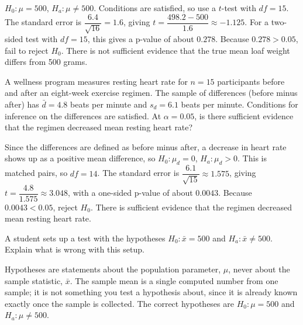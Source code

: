 \begin{Answer}[ref={ex:means-test-bakery}]
$H_0: \mu = 500$, $H_a: \mu \neq 500$. Conditions are satisfied, so use a $t$-test with $df = 15$. The standard error is $\dfrac{6.4}{\sqrt{16}} = 1.6$, giving $t = \dfrac{498.2 - 500}{1.6} \approx -1.125$. For a two-sided test with $df = 15$, this gives a p-value of about $0.278$. Because $0.278 > 0.05$, fail to reject $H_0$. There is not sufficient evidence that the true mean loaf weight differs from 500 grams.
\end{Answer}
 
\begin{Exercise}[title={A Matched-Pairs Test}, label={ex:means-test-paired}]
A wellness program measures resting heart rate for $n = 15$ participants before and after an eight-week exercise regimen. The sample of differences (before minus after) has $\bar{d} = 4.8$ beats per minute and $s_d = 6.1$ beats per minute. Conditions for inference on the differences are satisfied. At $\alpha = 0.05$, is there sufficient evidence that the regimen decreased mean resting heart rate?
\end{Exercise}
 
\begin{Answer}[ref={ex:means-test-paired}]
Since the differences are defined as before minus after, a decrease in heart rate shows up as a positive mean difference, so $H_0: \mu_d = 0$, $H_a: \mu_d > 0$. This is matched pairs, so $df = 14$. The standard error is $\dfrac{6.1}{\sqrt{15}} \approx 1.575$, giving $t = \dfrac{4.8}{1.575} \approx 3.048$, with a one-sided p-value of about $0.0043$. Because $0.0043 < 0.05$, reject $H_0$. There is sufficient evidence that the regimen decreased mean resting heart rate.
\end{Answer}
 
\begin{Exercise}[title={Spot the Error}, label={ex:means-test-hyp-error}]
A student sets up a test with the hypotheses $H_0: \bar{x} = 500$ and $H_a: \bar{x} \neq 500$. Explain what is wrong with this setup.
\end{Exercise}
 
\begin{Answer}[ref={ex:means-test-hyp-error}]
Hypotheses are statements about the population parameter, $\mu$, never about the sample statistic, $\bar{x}$. The sample mean is a single computed number from one sample; it is not something you test a hypothesis about, since it is already known exactly once the sample is collected. The correct hypotheses are $H_0: \mu = 500$ and $H_a: \mu \neq 500$.
\end{Answer}


